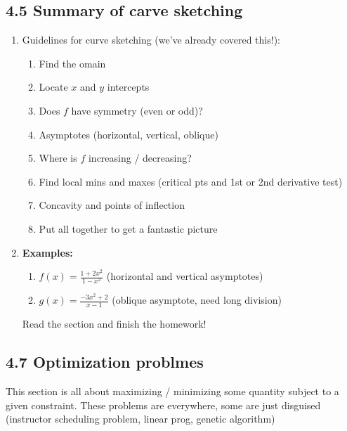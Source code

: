 \documentclass{article}
\begin{document}
\subsection{4.5 Summary of carve sketching}
\begin{enumerate}

\item Guidelines for curve sketching (we've already covered this!):
\begin{enumerate}
\item Find the omain
\item Locate $x$ and $y$ intercepts
\item Does $f$ have symmetry (even or odd)?
\item Asymptotes (horizontal, vertical, oblique)
\item Where is $f$ increasing / decreasing?
\item Find local mins and maxes (critical pts and 1st or 2nd derivative test)
\item Concavity and points of inflection 
\item Put all together to get a fantastic picture
\end{enumerate}

\item {\bf Examples:}
\begin{enumerate}
\item $f(x) = \frac{1+2x^2}{1-x^2}$ (horizontal and vertical asymptotes)
\item $ g(x) = \frac{-3x^2+2}{x-1}$ (oblique asymptote, need long division)
\end{enumerate}
Read the section and finish the homework!
\end{enumerate}


\subsection{4.7 Optimization problmes}
This section is all about maximizing / minimizing some quantity subject to a given constraint. These problems are everywhere, some are just disguised (instructor scheduling problem, linear prog, genetic algorithm) 
\end{document}
